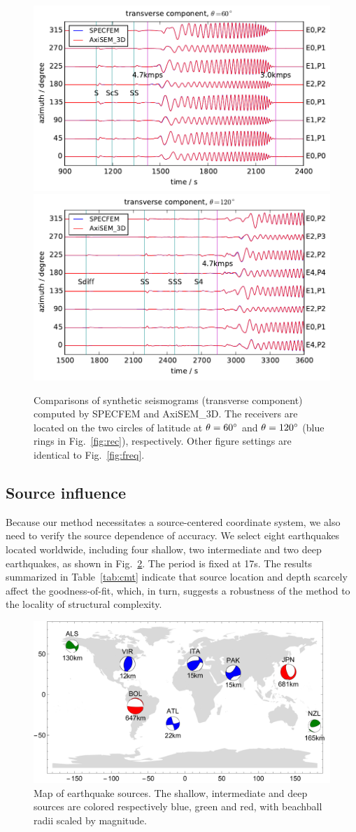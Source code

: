 \documentclass[extra]{gji}
\begin{document}
\begin{figure}
  \centering
  \includegraphics[width=.47\textwidth]{fig/ring/VIR_s3_11_60.pdf}\\\vspace{-5pt}
  \includegraphics[width=.47\textwidth]{fig/ring/VIR_s3_11_120.pdf}\vspace{-5pt}
  \caption{Comparisons of synthetic seismograms (transverse component) computed 
  by SPECFEM and AxiSEM\_3D. The receivers are located on the two circles of latitude 
  at $\theta=60\hbox{$^\circ$}$ and $\theta=120\hbox{$^\circ$}$ (blue rings in Fig.~\ref{fig:rec}), 
  respectively. Other figure settings are identical to Fig.~\ref{fig:freq}.}
  \label{fig:freq2}
\end{figure}

\subsection{Source influence}
\label{sec:bensrc}
Because our method necessitates a source-centered coordinate 
system, we also need to verify the source dependence of accuracy. 
We select eight earthquakes located worldwide, including four shallow, 
two intermediate and two deep earthquakes, as shown in Fig.~\ref{fig:cmt}.
The period is fixed at 17s. The results summarized in Table~\ref{tab:cmt}
indicate that source location and depth scarcely affect the goodness-of-fit,
which, in turn, suggests a robustness of the method to the locality 
of structural complexity.

\begin{figure}
  \centering
  \includegraphics[width=.48\textwidth]{fig/cmt/cmt.pdf}
  \caption{Map of earthquake sources. The shallow, intermediate 
  and deep sources are colored respectively blue, green and red,
  with beachball radii scaled by magnitude. }
  \label{fig:cmt}
\end{figure}   
\end{document}
